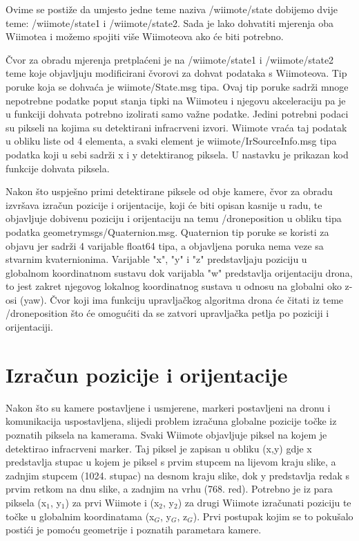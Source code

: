 \documentclass[times, utf8, diplomski]{fer}
\begin{document}
Ovime se postiže da umjesto jedne teme naziva /wiimote/state dobijemo dvije teme: /wiimote/state1 i /wiimote/state2. Sada je lako dohvatiti mjerenja oba Wiimotea i možemo spojiti više Wiimoteova ako će biti potrebno.

Čvor za obradu mjerenja pretplaćeni je na /wiimote/state1 i /wiimote/state2 teme koje objavljuju modificirani čvorovi za dohvat podataka s Wiimoteova. Tip poruke koja se dohvaća je wiimote/State.msg tipa. Ovaj tip poruke sadrži mnoge nepotrebne podatke poput stanja tipki na Wiimoteu i njegovu akceleraciju pa je u funkciji dohvata potrebno izolirati samo važne podatke. Jedini potrebni podaci su pikseli na kojima su detektirani infracrveni izvori. Wiimote vraća taj podatak u obliku liste od 4 elementa, a svaki element je wiimote/IrSourceInfo.msg tipa podatka koji u sebi sadrži x i y detektiranog piksela. U nastavku je prikazan kod funkcije dohvata piksela.

\vspace{5mm}  

Nakon što uspješno primi detektirane piksele od obje kamere, čvor za obradu izvršava izračun pozicije i orijentacije, koji će biti opisan kasnije u radu, te objavljuje dobivenu poziciju i orijentaciju na temu /drone\textunderscore position u obliku tipa podatka geometry\textunderscore msgs/Quaternion.msg. Quaternion tip poruke se koristi za objavu jer sadrži 4 varijable float64 tipa, a objavljena poruka nema veze sa stvarnim kvaternionima. Varijable "x", "y" i "z" predstavljaju poziciju u globalnom koordinatnom sustavu dok varijabla "w" predstavlja orijentaciju drona, to jest zakret njegovog lokalnog koordinatnog sustava u odnosu na globalni oko z-osi (yaw). Čvor koji ima funkciju upravljačkog algoritma drona će čitati iz teme /drone\textunderscore position što će omogućiti da se zatvori upravljačka petlja po poziciji i orijentaciji.

\chapter{Izračun pozicije i orijentacije}
Nakon što su kamere postavljene i usmjerene, markeri postavljeni na dronu i komunikacija uspostavljena, slijedi problem izračuna globalne pozicije točke iz poznatih piksela na kamerama. Svaki Wiimote objavljuje piksel na kojem je detektirao infracrveni marker. Taj piksel je zapisan u obliku (x,y) gdje x predstavlja stupac u kojem je piksel s prvim stupcem na lijevom kraju slike, a zadnjim stupcem (1024. stupac) na desnom kraju slike, dok y predstavlja redak s prvim retkom na dnu slike, a zadnjim na vrhu (768. red). Potrebno je iz para piksela (x$_1$, y$_1$) za prvi Wiimote i (x$_2$, y$_2$) za drugi Wiimote izračunati poziciju te točke u globalnim koordinatama (x$_G$, y$_G$, z$_G$). Prvi postupak kojim se to pokušalo postići je pomoću geometrije i poznatih parametara kamere.
\end{document}
